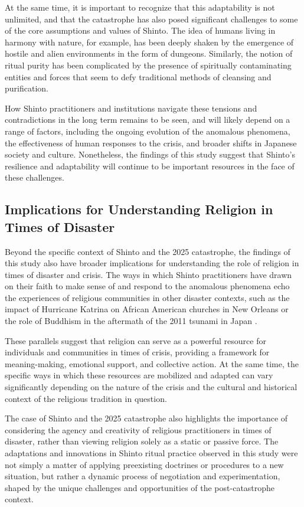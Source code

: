 \documentclass[12pt, a4paper]{article}
\begin{document}
At the same time, it is important to recognize that this adaptability is not unlimited, and that the catastrophe has also posed significant challenges to some of the core assumptions and values of Shinto. The idea of humans living in harmony with nature, for example, has been deeply shaken by the emergence of hostile and alien environments in the form of dungeons. Similarly, the notion of ritual purity has been complicated by the presence of spiritually contaminating entities and forces that seem to defy traditional methods of cleansing and purification.

How Shinto practitioners and institutions navigate these tensions and contradictions in the long term remains to be seen, and will likely depend on a range of factors, including the ongoing evolution of the anomalous phenomena, the effectiveness of human responses to the crisis, and broader shifts in Japanese society and culture. Nonetheless, the findings of this study suggest that Shinto's resilience and adaptability will continue to be important resources in the face of these challenges.

\subsection{Implications for Understanding Religion in Times of Disaster}
Beyond the specific context of Shinto and the 2025 catastrophe, the findings of this study also have broader implications for understanding the role of religion in times of disaster and crisis. The ways in which Shinto practitioners have drawn on their faith to make sense of and respond to the anomalous phenomena echo the experiences of religious communities in other disaster contexts, such as the impact of Hurricane Katrina on African American churches in New Orleans \citep{chan2011} or the role of Buddhism in the aftermath of the 2011 tsunami in Japan \citep{mclaughlin2013}.

These parallels suggest that religion can serve as a powerful resource for individuals and communities in times of crisis, providing a framework for meaning-making, emotional support, and collective action. At the same time, the specific ways in which these resources are mobilized and adapted can vary significantly depending on the nature of the crisis and the cultural and historical context of the religious tradition in question.

The case of Shinto and the 2025 catastrophe also highlights the importance of considering the agency and creativity of religious practitioners in times of disaster, rather than viewing religion solely as a static or passive force. The adaptations and innovations in Shinto ritual practice observed in this study were not simply a matter of applying preexisting doctrines or procedures to a new situation, but rather a dynamic process of negotiation and experimentation, shaped by the unique challenges and opportunities of the post-catastrophe context.
\end{document}

